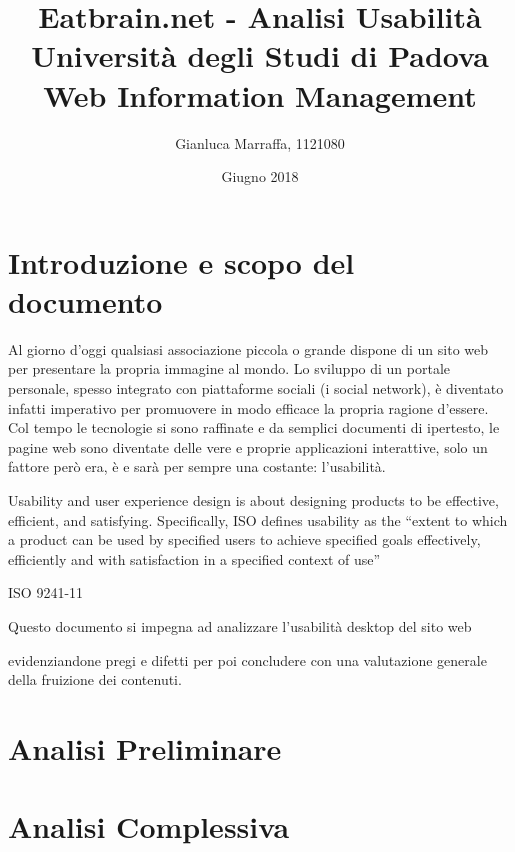 \documentclass[10pt,a4paper]{article}
\title{
  Eatbrain.net - Analisi Usabilità \\
  Università degli Studi di Padova \\
  Web Information Management
}
\author{
  Gianluca Marraffa, 1121080
}
\date{Giugno 2018}
\newcommand{\URI}[3][blue]{\href{#2}{\color{#1}{#3}}}%
\begin{document}
\maketitle
\newpage
{}
\tableofcontents
\newpage
{}

\section{Introduzione e scopo del documento}
Al giorno d'oggi qualsiasi associazione piccola o grande dispone di un sito web per presentare la propria immagine al mondo. Lo sviluppo di un portale personale, spesso integrato con piattaforme sociali (i social network), è diventato infatti imperativo per promuovere in modo efficace la propria ragione d'essere. Col tempo le tecnologie si sono raffinate e da semplici documenti di ipertesto, le pagine web sono diventate delle vere e proprie applicazioni interattive, solo un fattore però era, è e sarà per sempre una costante: l'usabilità.
\setlength{\epigraphwidth}{0.8\textwidth}
\epigraph{Usability and user experience design is about designing products to be effective, efficient, and satisfying. Specifically, ISO defines usability as the “extent to which a product can be used by specified users to achieve specified goals effectively, efficiently and with satisfaction in a specified context of use”}{ISO 9241-11}
Questo documento si impegna ad analizzare l'usabilità desktop del sito web
\begin{center}
	\URI{https://eatbrain.net/}{eatbrain.net}
\end{center}
 evidenziandone pregi e difetti per poi concludere con una valutazione generale della fruizione dei contenuti.
\newpage

\section{Analisi Preliminare}

\section{Analisi Complessiva}

\end{document}
